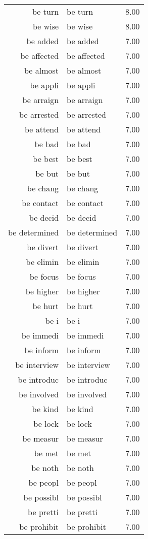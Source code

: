 \begin{table}[ht]
\begin{tabular}{rlr}
  be turn & be turn & 8.00 \\ 
  be wise & be wise & 8.00 \\ 
  be added & be added & 7.00 \\ 
  be affected & be affected & 7.00 \\ 
  be almost & be almost & 7.00 \\ 
  be appli & be appli & 7.00 \\ 
  be arraign & be arraign & 7.00 \\ 
  be arrested & be arrested & 7.00 \\ 
  be attend & be attend & 7.00 \\ 
  be bad & be bad & 7.00 \\ 
  be best & be best & 7.00 \\ 
  be but & be but & 7.00 \\ 
  be chang & be chang & 7.00 \\ 
  be contact & be contact & 7.00 \\ 
  be decid & be decid & 7.00 \\ 
  be determined & be determined & 7.00 \\ 
  be divert & be divert & 7.00 \\ 
  be elimin & be elimin & 7.00 \\ 
  be focus & be focus & 7.00 \\ 
  be higher & be higher & 7.00 \\ 
  be hurt & be hurt & 7.00 \\ 
  be i & be i & 7.00 \\ 
  be immedi & be immedi & 7.00 \\ 
  be inform & be inform & 7.00 \\ 
  be interview & be interview & 7.00 \\ 
  be introduc & be introduc & 7.00 \\ 
  be involved & be involved & 7.00 \\ 
  be kind & be kind & 7.00 \\ 
  be lock & be lock & 7.00 \\ 
  be measur & be measur & 7.00 \\ 
  be met & be met & 7.00 \\ 
  be noth & be noth & 7.00 \\ 
  be peopl & be peopl & 7.00 \\ 
  be possibl & be possibl & 7.00 \\ 
  be pretti & be pretti & 7.00 \\ 
  be prohibit & be prohibit & 7.00 \\ 

\end{tabular}
\end{table}
